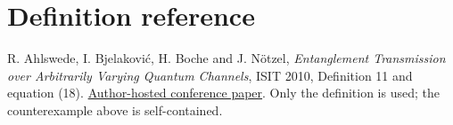 \documentclass[11pt]{article}
\begin{document}
\section*{Definition reference}
R. Ahlswede, I. Bjelakovi\'c, H. Boche and J. N\"otzel,
\emph{Entanglement Transmission over Arbitrarily Varying Quantum Channels}, ISIT 2010, Definition 11 and equation (18).
\href{https://mediatum.ub.tum.de/doc/1070709/758380.pdf}{Author-hosted conference paper}.
Only the definition is used; the counterexample above is self-contained.
\end{document}

